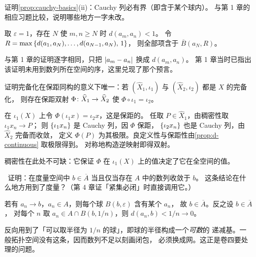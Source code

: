\begin{exercise}[结构]
  \label{exr:cauchy-bounded-again}
  证明\cref{prop:cauchy-basics}(ii)：Cauchy 列必有界（即含于某个球内）。
  与第 1 章的相应习题比较，说明哪些地方一字未改。
  \begin{solution}
    取 \(\varepsilon=1\)，存在 \(N\) 使 \(m,n \ge N\) 时 \(d(a_{m},a_{n})<1\)。
    令 \(R = \max\left\{d(a_{1},a_{N}),\dots,d(a_{N-1},a_{N}),\,1\right\}\)，
    则全部项含于 \(\overline{B}(a_{N},R)\)。

    与第 1 章的证明逐字相同，只把 \(\lvert a_{m}-a_{n}\rvert\) 换成 \(d(a_{m},a_{n})\)。
    第 1 章当时已指出该证明未用到数列所在空间的序，这里兑现了那个预言。
  \end{solution}
\end{exercise}

\begin{exercise}[结构]
  \label{exr:completion-unique}
  证明完备化在保距同构的意义下唯一：若 \((\widehat{X}_{1},\iota_{1})\) 与
  \((\widehat{X}_{2},\iota_{2})\) 都是 \(X\) 的完备化，
  则存在保距双射 \(\Phi \colon \widehat{X}_{1} \to \widehat{X}_{2}\)
  使 \(\Phi \circ \iota_{1} = \iota_{2}\)。
  \begin{solution}
    在 \(\iota_{1}(X)\) 上令 \(\Phi(\iota_{1}x) = \iota_{2}x\)，这是保距的。
    任取 \(P \in \widehat{X}_{1}\)，由稠密性取 \(\iota_{1}x_{n} \to P\)；
    则 \(\{\iota_{1}x_{n}\}\) 是 Cauchy 列，因 \(\Phi\) 保距，
    \(\{\iota_{2}x_{n}\}\) 也是 Cauchy 列，由 \(\widehat{X}_{2}\) 完备而收敛，
    定义 \(\Phi(P)\) 为其极限。良定义性与保距性由\cref{prop:d-continuous} 取极限得到。
    对称地构造逆映射即得双射。

    稠密性在此处不可缺：它保证 \(\Phi\) 在 \(\iota_{1}(X)\) 上的值决定了它在全空间的值。
  \end{solution}
\end{exercise}

\begin{exercise}[结构]
  \label{exr:sequential-closure}
  \needlater\
  证明：在度量空间中 \(b \in \overline{A}\) 当且仅当存在 \(A\) 中的数列收敛于 \(b\)。
  这条结论在什么地方用到了度量？（第 4 章证「紧集必闭」时直接调用它。）
  \begin{solution}
    若有 \(a_{n} \to b\)，\(a_{n} \in A\)，则每个球 \(B(b,\varepsilon)\) 含有某个 \(a_{n}\)，
    故 \(b \in \overline{A}\)。反之设 \(b \in \overline{A}\)，
    对每个 \(n\) 取 \(a_{n} \in A \cap B(b,1/n)\)，则 \(d(a_{n},b)<1/n \to 0\)。

    反向用到了「可以取半径为 \(1/n\) 的球」，即球的半径构成一个\emph{可数}的
    递减基。一般拓扑空间没有这条，因而数列不足以刻画闭包，
    必须换成网。这正是卷四要处理的问题。
  \end{solution}
\end{exercise}

